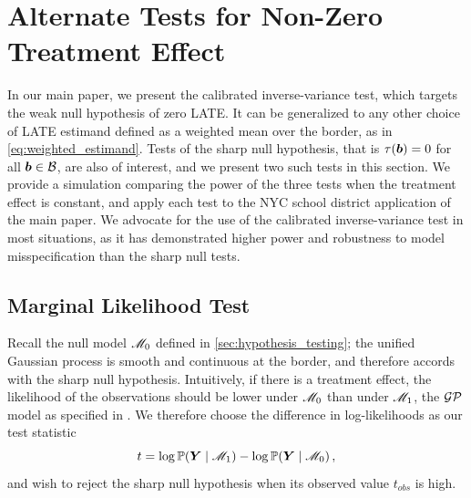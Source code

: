 \section{Alternate Tests for Non-Zero Treatment Effect}
\label{sec:alternate_tests}

	In our main paper, we present the calibrated inverse-variance test, which targets the weak null hypothesis of zero LATE.
It can be generalized to any other choice of LATE estimand defined as a weighted mean over the border, as in \autoref{eq:weighted_estimand}.
Tests of the sharp null hypothesis, that is \(\tau(\bm{b})=0\) for all \(\bm{b} \in \mathcal{B}\), are also of interest, and we present two such tests in this section.
We provide a simulation comparing the power of the three tests when the treatment effect is constant, and apply each test to the NYC school district application of the main paper.
We advocate for the use of the calibrated inverse-variance test in most situations, as it has demonstrated higher power and robustness to model misspecification than the sharp null tests.

\subsection{Marginal Likelihood Test}

	Recall the null model \(\mathscr{M}_0\) defined in \autoref{sec:hypothesis_testing}; the unified Gaussian process is smooth and continuous at the border, and therefore accords with the sharp null hypothesis.
Intuitively, if there is a treatment effect, the likelihood of the observations should be lower under \(\mathscr{M}_0\) than under \(\mathscr{M}_1\),
the \(\operatorname{\mathcal{GP}}\) model as specified in .
We therefore choose the difference in log-likelihoods as our test statistic
\begin{equation}
    t = \log \Pr\del{\Yvec \mid \modalt} - \log \Pr\del{\Yvec \mid \modnull} \,,
\end{equation}
and wish to reject the sharp null hypothesis when its observed value \(t_{obs}\) is high.


